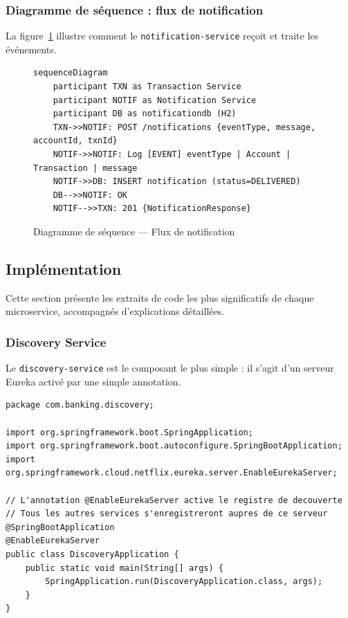 \documentclass[12pt,a4paper]{article}
\begin{document}
\subsubsection{Diagramme de séquence : flux de notification}

La figure~\ref{fig:seq_notif} illustre comment le \texttt{notification-service} reçoit et traite les événements.

\begin{figure}[H]
\centering
\begin{verbatim}
sequenceDiagram
    participant TXN as Transaction Service
    participant NOTIF as Notification Service
    participant DB as notificationdb (H2)
    TXN->>NOTIF: POST /notifications {eventType, message, accountId, txnId}
    NOTIF->>NOTIF: Log [EVENT] eventType | Account | Transaction | message
    NOTIF->>DB: INSERT notification (status=DELIVERED)
    DB-->>NOTIF: OK
    NOTIF-->>TXN: 201 {NotificationResponse}
\end{verbatim}
\caption{Diagramme de séquence --- Flux de notification}
\label{fig:seq_notif}
\end{figure}

\subsection{Implémentation}

Cette section présente les extraits de code les plus significatifs de chaque microservice, accompagnés d'explications détaillées.

\subsubsection{Discovery Service}

Le \texttt{discovery-service} est le composant le plus simple : il s'agit d'un serveur Eureka activé par une simple annotation.

\begin{lstlisting}[style=javastyle, caption={DiscoveryApplication.java --- Point d'entrée du serveur Eureka}, label=lst:discovery]
package com.banking.discovery;

import org.springframework.boot.SpringApplication;
import org.springframework.boot.autoconfigure.SpringBootApplication;
import org.springframework.cloud.netflix.eureka.server.EnableEurekaServer;

// L'annotation @EnableEurekaServer active le registre de decouverte
// Tous les autres services s'enregistreront aupres de ce serveur
@SpringBootApplication
@EnableEurekaServer
public class DiscoveryApplication {
    public static void main(String[] args) {
        SpringApplication.run(DiscoveryApplication.class, args);
    }
}
\end{lstlisting}
\end{document}
